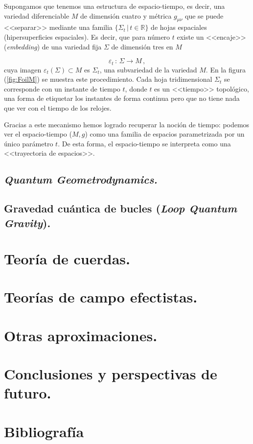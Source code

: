 \documentclass[11pt,a4paper,titlepage]{article}
\begin{document}
Supongamos que tenemos una estructura de espacio-tiempo, es decir, una variedad diferenciable $M$ de dimensión cuatro y métrica $g_{\mu\nu}$ que se puede <<separar>> mediante una familia $\{\Sigma_t\,|\,t\in\mathbb{R}\}$ de hojas espaciales (hipersuperficies espaciales). Es decir, que para número $t$ existe un <<encaje>> (\emph{embedding}) de una variedad fija $\Sigma$ de dimensión tres en $M$

\begin{equation*}
 \varepsilon_t\,:\,\Sigma\rightarrow M\,,
\end{equation*}
cuya imagen $\varepsilon_t(\Sigma)\subset M$ es $\Sigma_t$, una subvariedad de la variedad $M$. En la figura (\ref{fig:FoilM}) se muestra este procedimiento. Cada hoja tridimensional $\Sigma_t$ se corresponde con un instante de tiempo $t$, donde $t$ es un <<tiempo>> topológico, una forma de etiquetar los instantes de forma continua pero que no tiene nada que ver con el tiempo de los relojes.

Gracias a este mecanismo hemos logrado recuperar la noción de tiempo: podemos ver el espacio-tiempo ($M,g$) como una familia de espacios parametrizada por un único parámetro $t$. De esta forma, el espacio-tiempo se interpreta como una <<trayectoria de espacios>>.


\subsection{\textit{Quantum Geometrodynamics.}}

\subsection{Gravedad cuántica de bucles (\textit{Loop Quantum Gravity}).}

%
%
%
%
\section{Teoría de cuerdas.}

%
%
%
%
\section{Teorías de campo efectistas.} %

%
%
%
%
\section{Otras aproximaciones.} %

%
%
%
%
\section{Conclusiones y perspectivas de futuro.} %

%
%
%
%
\section{Bibliografía}


\nocite{*}
\end{document}
